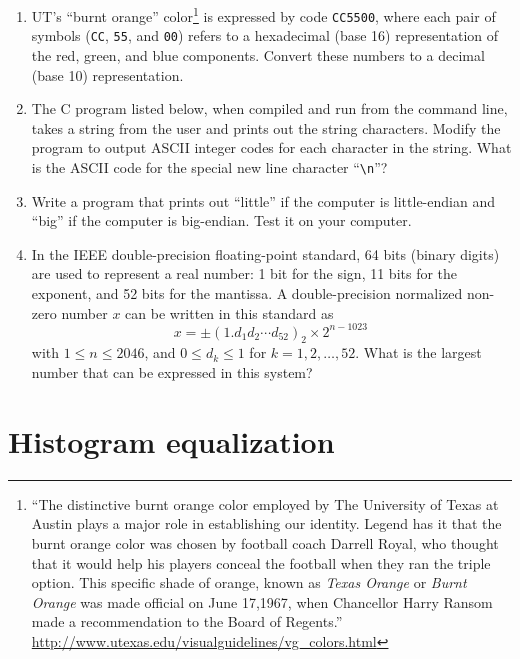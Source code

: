 \begin{enumerate}

\item UT's ``burnt orange'' color\footnote{``The distinctive burnt
    orange color employed by The University of Texas at Austin plays a
    major role in establishing our identity. Legend has it that the
    burnt orange color was chosen by football coach Darrell Royal, who
    thought that it would help his players conceal the football when
    they ran the triple option. This specific shade of orange, known
    as \emph{Texas Orange} or \emph{Burnt Orange} was made official on
    June 17,1967, when Chancellor Harry Ransom made a recommendation
    to the Board of Regents.''
    \url{http://www.utexas.edu/visualguidelines/vg_colors.html}} is
    expressed by code \texttt{CC5500}, where each pair of symbols
    (\texttt{CC}, \texttt{55}, and \texttt{00}) refers to a
    hexadecimal (base 16) representation of the red, green, and blue
    components. Convert these numbers to a decimal (base 10)
    representation.

\item The C program listed below, when compiled and run from the
    command line, takes a string from the user and prints out the
    string characters. Modify the program to output ASCII integer
    codes for each character in the string. What is the ASCII code for
    the special new line character ``\verb+\n+''?

\lstset{language=c,numbers=left,numberstyle=\tiny,showstringspaces=false}


\item Write a program that prints out ``little'' if the computer is
  little-endian and ``big'' if the computer is big-endian. Test it on
  your computer.

\item In the IEEE double-precision floating-point standard, 64 bits
  (binary digits) are used to represent a real number: 1 bit for the
  sign, 11 bits for the exponent, and 52 bits for the mantissa. A
  double-precision normalized non-zero number $x$ can be written in
  this standard as 
  \[
  x = \pm (1.d_1d_2{\cdots}d_{52})_2 \times 2^{n-1023}\,
  \]
  with $1 \le n \le 2046$, and $0 \le d_k \le 1$ for
  $k=1,2,\ldots,52$. What is the largest number that can be expressed
  in this system?

\end{enumerate}

\section{Histogram equalization}

